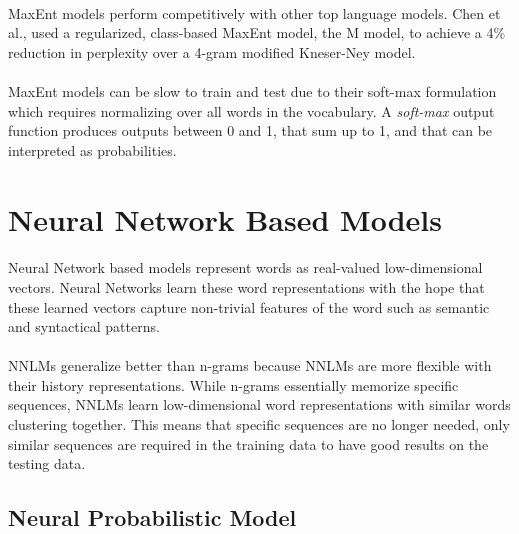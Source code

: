 \documentclass[12pt]{ociamthesis}
\begin{document}
\paragraph{}
MaxEnt models perform competitively with other top language models. Chen et al., used a regularized, class-based MaxEnt model, the M model, to achieve a 4\% reduction in perplexity over a 4-gram modified Kneser-Ney model.
\paragraph{}

MaxEnt models can be slow to train and test due to their soft-max formulation which requires normalizing over all words in the vocabulary. A \emph{soft-max} output function produces outputs between 0 and 1, that sum up to 1, and that can be interpreted as probabilities. 

\section{Neural Network Based Models}
\paragraph{}
Neural Network based models represent words as real-valued low-dimensional vectors. Neural Networks learn these word representations with the hope that these learned vectors capture non-trivial features of the word such as semantic and syntactical patterns.
\paragraph{}
NNLMs generalize better than n-grams because NNLMs are more flexible with their history representations. While n-grams essentially memorize specific sequences, NNLMs learn low-dimensional word representations with similar words clustering together. This means that specific sequences are no longer needed, only similar sequences are required in the training data to have good results on the testing data.


\subsection{Neural Probabilistic Model}
\end{document}
